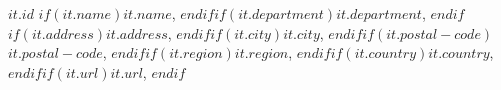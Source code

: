 \textbf{$it.id$} $if(it.name)$$it.name$, $endif$$if(it.department)$$it.department$, $endif$$if(it.address)$$it.address$, $endif$$if(it.city)$$it.city$, $endif$$if(it.postal-code)$$it.postal-code$, $endif$$if(it.region)$$it.region$, $endif$$if(it.country)$$it.country$, $endif$$if(it.url)$$it.url$, $endif$
